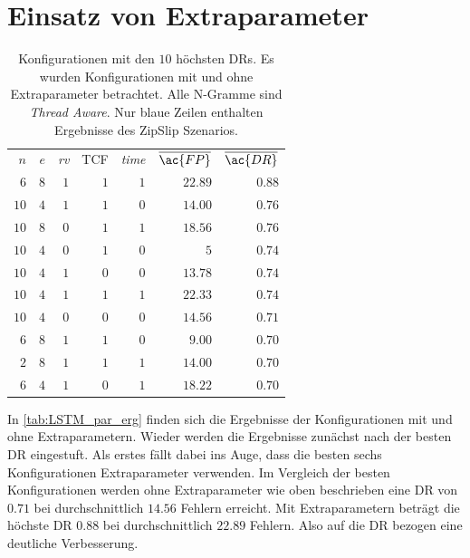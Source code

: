 \section{Einsatz von Extraparameter}\label{sec:erg_LSTM_extra}
    \begin{table}[ht]
        \centering
        \begin{tabular}{rrrrrrr}
            \hline
            \rowcolor{GruvGray!36}
            \multicolumn{7}{c}{Mit Extraparametern nach \ac{DR}}\\
            \toprule
            $n$ & $e$ & \textit{rv} & \ac{TCF} & \textit{time} & $\overline{\ac{FP}}$ & $\overline{\ac{DR}}$ \\
            \midrule
            \rowcolor{GruvGray!16}
            $6$ & 	$8$ & 	$1$ & 	$1$ & 	$1$ & 	$22.89$ & 	$0.88$ \\
            $10$ & 	$4$ & 	$1$ & 	$1$ & 	$0$ & 	$14.00$ & 	$0.76$ \\
            \rowcolor{GruvGray!16}
            $10$ & 	$8$ & 	$0$ & 	$1$ & 	$1$ & 	$18.56$ & 	$0.76$ \\
            $10$ & 	$4$ & 	$0$ & 	$1$ & 	$0$ & 	$5$ & 	    $0.74$ \\
            \rowcolor{GruvGray!16}
            $10$ & 	$4$ & 	$1$ & 	$0$ & 	$0$ & 	$13.78$ & 	$0.74$ \\
            $10$ & 	$4$ & 	$1$ & 	$1$ & 	$1$ & 	$22.33$ & 	$0.74$ \\
            \rowcolor{GruvGray!16}
            $10$ & 	$4$ & 	$0$ & 	$0$ & 	$0$ & 	$14.56$ & 	$0.71$ \\
            $6$ & 	$8$ & 	$1$ & 	$1$ & 	$0$ & 	$9.00$ & 	    $0.70$ \\
            \rowcolor{GruvGray!16}
            \rowcolor{CTblue!16}
            $2$ & 	$8$ & 	$1$ & 	$1$ & 	$1$ & 	$14.00$ & 	$0.70$ \\
            $6$ & 	$4$ & 	$1$ & 	$0$ & 	$1$ & 	$18.22$ & 	$0.70$ \\
            \hline
        \end{tabular}
        \caption[Ergebnisse nach \ac{DR} mit Extraparametern]{Konfigurationen mit den $10$ höchsten \acp{DR}. 
                 Es wurden Konfigurationen mit und ohne Extraparameter betrachtet.
                 Alle N-Gramme sind \textit{Thread Aware}.
                 Nur blaue Zeilen enthalten Ergebnisse des ZipSlip Szenarios.}
        \label{tab:LSTM_par_erg}
    \end{table}
    In \autoref{tab:LSTM_par_erg} finden sich die Ergebnisse der Konfigurationen mit und ohne Extraparametern. 
    Wieder werden die Ergebnisse zunächst nach der besten \ac{DR} eingestuft.
    Als erstes fällt dabei ins Auge, dass die besten sechs Konfigurationen Extraparameter verwenden.
    Im Vergleich der besten Konfigurationen werden ohne Extraparameter wie oben beschrieben eine \ac{DR} von $0.71$ bei durchschnittlich $14.56$ Fehlern erreicht.
    Mit Extraparametern beträgt die höchste \ac{DR} $0.88$ bei durchschnittlich $22.89$ Fehlern.
    Also auf die \ac{DR} bezogen eine deutliche Verbesserung.\par\medskip

